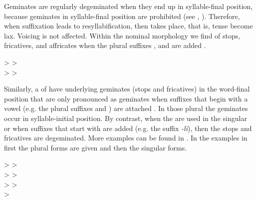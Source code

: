 Geminates are regularly degeminated when they end up in syllable-final position, because geminates in syllable-final position are prohibited (see , ). Therefore, when suffixation leads to resyllabification, then  takes place, that is, tense  become lax. Voicing is not affected. Within the nominal morphology we find  of stops, fricatives, and affricates when the plural suffixes ,  and  are added .
%
\begin{exe}
	\ex	\label{ex:degemination be ne me phon}
\TabPositions{14em} 
		 >  	\tab 	{} >   \\
		 >  		\tab 	{} >  
\end{exe}

Similarly, a  of  have underlying geminates (stops and fricatives) in the word-final position that are only pronounced as geminates when suffixes that begin with a vowel (e.g. the plural suffixes  and ) are attached  . In those plural  the geminates occur in syllable-initial position. By contrast, when the  are used in the singular or when suffixes that start with  are added (e.g. the  suffix \textit{-li}), then the stops and fricatives are degeminated. More examples can be found in . In the examples in  first the plural forms are given and then the singular forms.
  
%
\begin{exe}
	\ex	\label{ex:gemination e upee phon}
\TabPositions{13em} 
		  >  	\tab 		{} >   \\
		 >  	\tab 		{} >   \\
		 >   	\tab 		{} >   \\
		 >   
\end{exe}



